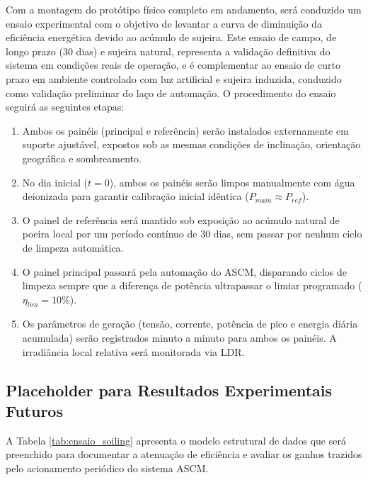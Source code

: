\documentclass[12pt, a4paper]{article}
\begin{document}
Com a montagem do protótipo físico completo em andamento, será conduzido um ensaio experimental com o objetivo de levantar a curva de diminuição da eficiência energética devido ao acúmulo de sujeira. Este ensaio de campo, de longo prazo (30 dias) e sujeira natural, representa a validação definitiva do sistema em condições reais de operação, e é complementar ao ensaio de curto prazo em ambiente controlado com luz artificial e sujeira induzida, conduzido como validação preliminar do laço de automação. O procedimento do ensaio seguirá as seguintes etapas:
\begin{enumerate}
    \item Ambos os painéis (principal e referência) serão instalados externamente em suporte ajustável, expostos sob as mesmas condições de inclinação, orientação geográfica e sombreamento.
    \item No dia inicial ($t=0$), ambos os painéis serão limpos manualmente com água deionizada para garantir calibração inicial idêntica ($P_{main} \approx P_{ref}$).
    \item O painel de referência será mantido sob exposição ao acúmulo natural de poeira local por um período contínuo de 30 dias, sem passar por nenhum ciclo de limpeza automática.
    \item O painel principal passará pela automação do ASCM, disparando ciclos de limpeza sempre que a diferença de potência ultrapassar o limiar programado ($\eta_{lim} = 10\%$).
    \item Os parâmetros de geração (tensão, corrente, potência de pico e energia diária acumulada) serão registrados minuto a minuto para ambos os painéis. A irradiância local relativa será monitorada via LDR.
\end{enumerate}

\subsection{Placeholder para Resultados Experimentais Futuros}

A Tabela \ref{tab:ensaio_soiling} apresenta o modelo estrutural de dados que será preenchido para documentar a atenuação de eficiência e avaliar os ganhos trazidos pelo acionamento periódico do sistema ASCM.
\end{document}
